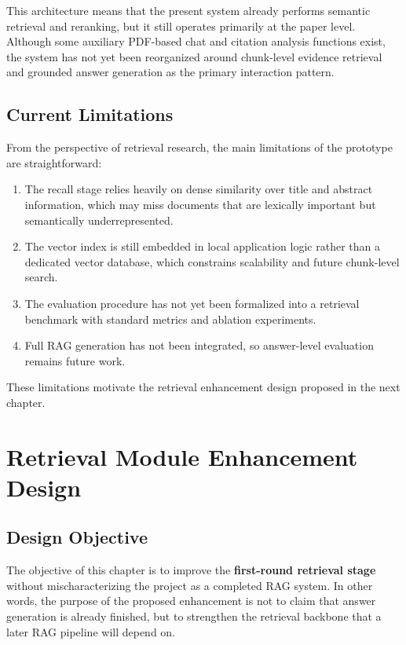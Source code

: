 \documentclass[11pt,a4paper,oneside]{report}
\begin{document}
This architecture means that the present system already performs semantic retrieval
and reranking, but it still operates primarily at the paper level. Although some
auxiliary PDF-based chat and citation analysis functions exist, the system has not yet
been reorganized around chunk-level evidence retrieval and grounded answer generation
as the primary interaction pattern.

\section{Current Limitations}

From the perspective of retrieval research, the main limitations of the prototype are
straightforward:

\begin{enumerate}
  \item The recall stage relies heavily on dense similarity over title and abstract
  information, which may miss documents that are lexically important but semantically
  underrepresented.
  \item The vector index is still embedded in local application logic rather than a
  dedicated vector database, which constrains scalability and future chunk-level search.
  \item The evaluation procedure has not yet been formalized into a retrieval benchmark
  with standard metrics and ablation experiments.
  \item Full RAG generation has not been integrated, so answer-level evaluation remains
  future work.
\end{enumerate}

These limitations motivate the retrieval enhancement design proposed in the next
chapter.

\chapter{Retrieval Module Enhancement Design}

\section{Design Objective}

The objective of this chapter is to improve the \textbf{first-round retrieval stage}
without mischaracterizing the project as a completed RAG system. In other words, the
purpose of the proposed enhancement is not to claim that answer generation is already
finished, but to strengthen the retrieval backbone that a later RAG pipeline will
depend on.
\end{document}
